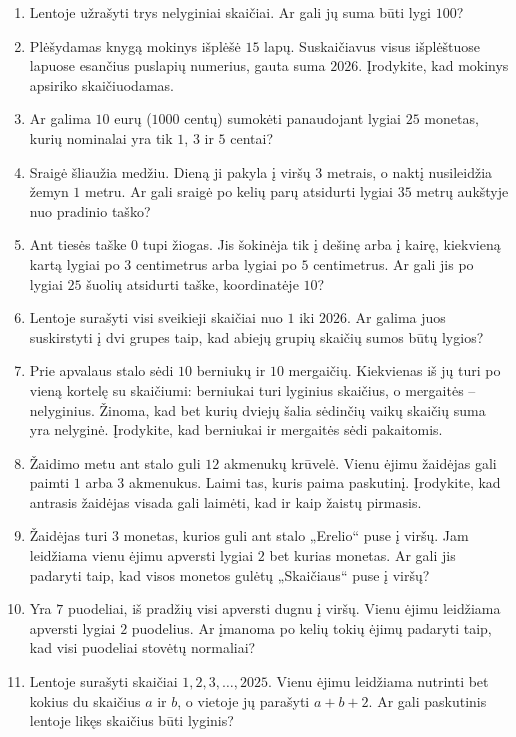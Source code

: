 \documentclass[11pt,a4paper]{scrartcl}
\begin{document}
\begin{enumerate}
    \renewcommand{\labelenumi}{\textbf{\theenumi.}}
    \item Lentoje užrašyti trys nelyginiai skaičiai. Ar gali jų suma būti lygi $100$?
    \item Plėšydamas knygą mokinys išplėšė $15$ lapų. Suskaičiavus visus išplėštuose lapuose esančius puslapių numerius, gauta suma $2026$. Įrodykite, kad mokinys apsiriko skaičiuodamas.
    \item Ar galima $10$ eurų ($1000$ centų) sumokėti panaudojant lygiai $25$ monetas, kurių nominalai yra tik $1$, $3$ ir $5$ centai?
    \item Sraigė šliaužia medžiu. Dieną ji pakyla į viršų $3$ metrais, o naktį nusileidžia žemyn $1$ metru. Ar gali sraigė po kelių parų atsidurti lygiai $35$ metrų aukštyje nuo pradinio taško?
    \item Ant tiesės taške $0$ tupi žiogas. Jis šokinėja tik į dešinę arba į kairę, kiekvieną kartą lygiai po $3$ centimetrus arba lygiai po $5$ centimetrus. Ar gali jis po lygiai $25$ šuolių atsidurti taške, koordinatėje $10$?
    \item Lentoje surašyti visi sveikieji skaičiai nuo $1$ iki $2026$. Ar galima juos suskirstyti į dvi grupes taip, kad abiejų grupių skaičių sumos būtų lygios?
    \item Prie apvalaus stalo sėdi $10$ berniukų ir $10$ mergaičių. Kiekvienas iš jų turi po vieną kortelę su skaičiumi: berniukai turi lyginius skaičius, o mergaitės -- nelyginius. Žinoma, kad bet kurių dviejų šalia sėdinčių vaikų skaičių suma yra nelyginė. Įrodykite, kad berniukai ir mergaitės sėdi pakaitomis.
    \item Žaidimo metu ant stalo guli $12$ akmenukų krūvelė. Vienu ėjimu žaidėjas gali paimti $1$ arba $3$ akmenukus. Laimi tas, kuris paima paskutinį. Įrodykite, kad antrasis žaidėjas visada gali laimėti, kad ir kaip žaistų pirmasis.
    \item Žaidėjas turi $3$ monetas, kurios guli ant stalo „Erelio“ puse į viršų. Jam leidžiama vienu ėjimu apversti lygiai $2$ bet kurias monetas. Ar gali jis padaryti taip, kad visos monetos gulėtų „Skaičiaus“ puse į viršų?
    \item Yra $7$ puodeliai, iš pradžių visi apversti dugnu į viršų. Vienu ėjimu leidžiama apversti lygiai $2$ puodelius. Ar įmanoma po kelių tokių ėjimų padaryti taip, kad visi puodeliai stovėtų normaliai?
    \item Lentoje surašyti skaičiai $1, 2, 3, \ldots, 2025$. Vienu ėjimu leidžiama nutrinti bet kokius du skaičius $a$ ir $b$, o vietoje jų parašyti $a+b+2$. Ar gali paskutinis lentoje likęs skaičius būti lyginis?

\end{enumerate}
\end{document}
